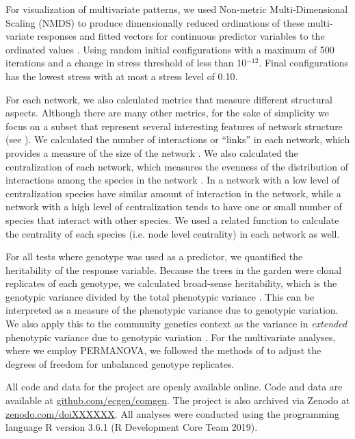 \documentclass[11pt,twocolumn,twoside,lineno]{pnas-new}
\begin{document}
{For visualization of multivariate patterns, we used Non-metric
Multi-Dimensional Scaling (NMDS) \cite{ecodist} to produce
dimensionally reduced ordinations of these multi-variate responses and
fitted vectors for continuous predictor variables to the ordinated
values \cite{vegan}. Using random initial configurations with a
maximum of 500 iterations and a change in stress threshold of less
than 10$^{-12}$. Final configurations has the lowest stress with at
most a stress level of 0.10.

For each network, we also calculated metrics that measure different
structural aspects. Although there are many other metrics, for the
sake of simplicity we focus on a subset that represent several
interesting features of network structure (see \citep{Lau2017a}). We
calculated the number of interactions or ``links'' in each network,
which provides a measure of the size of the network \citep{Lau2015a,
  Borrett2014EnaR:Analysis}. We also calculated the centralization of
each network, which measures the evenness of the distribution of
interactions among the species in the network \cite{sna}. In a network
with a low level of centralization species have similar amount of
interaction in the network, while a network with a high level of
centralization tends to have one or small number of species that
interact with other species. We used a related function to calculate
the centrality of each species (i.e. node level centrality) in each
network as well.

For all tests where genotype was used as a predictor, we quantified
the heritability of the response variable. Because the trees in the
garden were clonal replicates of each genotype, we calculated
broad-sense heritability, which is the genotypic variance divided by
the total phenotypic variance \cite{Conner2004ATextbook}. This can be
interpreted as a measure of the phenotypic variance due to genotypic
variation. We also apply this to the community genetics context as the
variance in \textit{extended} phenotypic variance due to genotypic
variation \cite{DawkinsTheGene}. For the multivariate analyses, where
we employ PERMANOVA, we followed the methods of
\citep{Shuster2006COMMUNITYSTRUCTURE} to adjust the degrees of freedom
for unbalanced genotype replicates.

All code and data for the project are openly available online. Code
and data are available at \url{github.com/ecgen/comgen}. The project
is also archived via Zenodo at \url{zenodo.com/doiXXXXXX}. All
analyses were conducted using the programming language R version 3.6.1
(R Development Core Team 2019).

}
\end{document}
